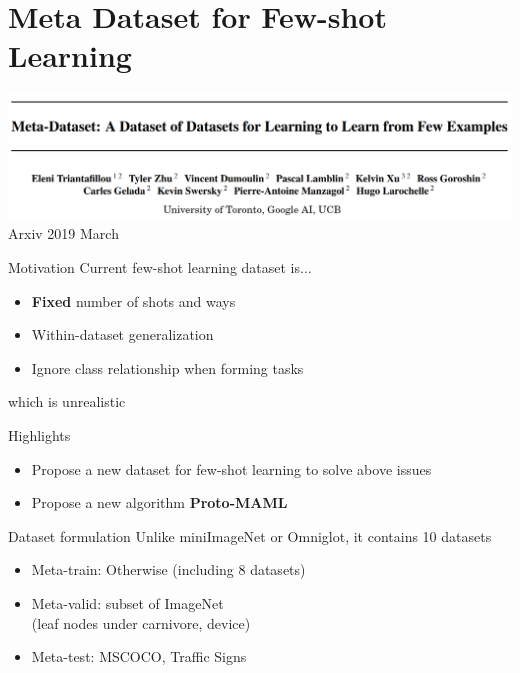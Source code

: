 \documentclass{beamer}
\begin{document}
\section{Meta Dataset for Few-shot Learning}

\begin{frame}
  \includegraphics[width=\textwidth]{fig/MD.png}
  \center Arxiv 2019 March
\end{frame}

\begin{frame}{Motivation}
  Current few-shot learning dataset is...
  \begin{itemize}
    \item \textbf{Fixed} number of shots and ways
    \item Within-dataset generalization
    \item Ignore class relationship when forming tasks
  \end{itemize}

  \pause
  \center which is unrealistic
\end{frame}

\begin{frame}{Highlights}
  \begin{itemize}
    \item Propose a new dataset for few-shot learning to solve above issues
    \item Propose a new algorithm \textbf{Proto-MAML}
  \end{itemize}
\end{frame}

\begin{frame}{Dataset formulation}
  Unlike miniImageNet or Omniglot, it contains 10 datasets
  \begin{itemize}
    \item Meta-train: Otherwise (including 8 datasets)
    \item Meta-valid: subset of ImageNet \\
      (leaf nodes under carnivore, device)
    \item Meta-test: MSCOCO, Traffic Signs
  \end{itemize}
\end{frame}
\end{document}
